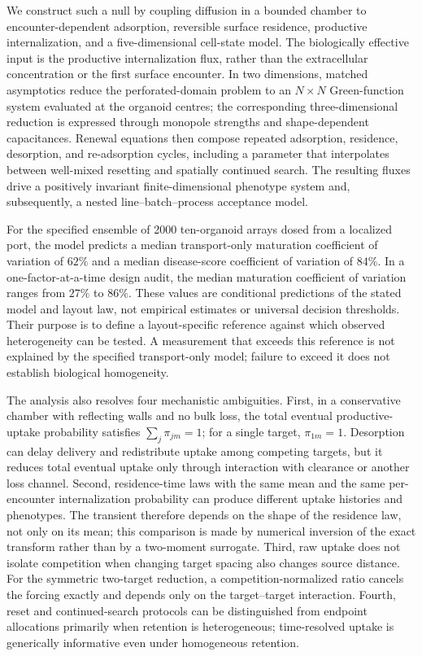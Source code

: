 \documentclass[pdflatex,sn-mathphys-num]{sn-jnl}
\numberwithin{equation}{section}
\theoremstyle{thmstyleone}%
\theoremstyle{definition}
\theoremstyle{remark}
\begin{document}
We construct such a null by coupling diffusion in a bounded chamber to encounter-dependent adsorption, reversible surface residence, productive internalization, and a five-dimensional cell-state model. The biologically effective input is the productive internalization flux, rather than the extracellular concentration or the first surface encounter. In two dimensions, matched asymptotics reduce the perforated-domain problem to an $N\times N$ Green-function system evaluated at the organoid centres; the corresponding three-dimensional reduction is expressed through monopole strengths and shape-dependent capacitances. Renewal equations then compose repeated adsorption, residence, desorption, and re-adsorption cycles, including a parameter that interpolates between well-mixed resetting and spatially
continued search. The resulting fluxes drive a positively invariant finite-dimensional phenotype system and, subsequently, a nested line--batch--process acceptance model.

For the specified ensemble of 2000 ten-organoid arrays dosed from a localized port, the model predicts a median transport-only maturation coefficient of variation of $62\%$ and a median disease-score coefficient of variation of $84\%$. In a one-factor-at-a-time design audit, the median maturation coefficient of variation ranges from $27\%$ to $86\%$. These values are conditional predictions of the stated model and layout law, not empirical estimates or universal decision thresholds. Their purpose is to define a layout-specific reference against which observed heterogeneity can be tested. A measurement that exceeds this reference is not explained by the specified transport-only model; failure to exceed it does not establish biological homogeneity.

The analysis also resolves four mechanistic ambiguities. First, in a conservative chamber with reflecting walls and no bulk loss, the total eventual productive-uptake probability satisfies $\sum_j\pi_{jm}=1$; for a single target, $\pi_{1m}=1$. Desorption can delay delivery and redistribute uptake among competing targets, but it reduces total eventual uptake only through interaction with clearance or another loss channel. Second, residence-time laws with the same mean and the same per-encounter internalization probability can produce different uptake histories and phenotypes. The transient therefore depends on
the shape of the residence law, not only on its mean; this comparison is made by numerical inversion of the exact transform rather than by a two-moment surrogate. Third, raw uptake does not isolate competition when changing target spacing also changes source distance. For the symmetric two-target reduction, a competition-normalized ratio cancels the forcing exactly and depends only on the target--target interaction. Fourth, reset and continued-search protocols can be distinguished from endpoint allocations primarily when retention is heterogeneous; time-resolved uptake is generically informative even under
homogeneous retention.
\end{document}
